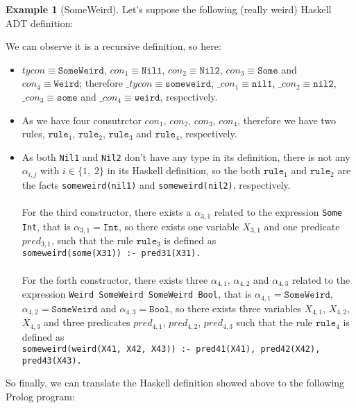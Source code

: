 \documentclass{report}
\theoremstyle{definition}
\newtheorem{example}{Example}[section]
\theoremstyle{definition}
\newcommand{\ttt}[1]{\texttt{#1}}
\begin{document}
\begin{example}[SomeWeird]
	Let's suppose the following (really weird) Haskell ADT definition:
	
	We can observe it is a recursive definition, so here:
	\begin{itemize}
		\item $tycon \equiv \ttt{SomeWeird}$, $con_1 \equiv \ttt{Nil1}$, $con_2 \equiv \ttt{Nil2}$, $con_3 \equiv \ttt{Some}$ and $con_4 \equiv \ttt{Weird}$; therefore $\_tycon \equiv \ttt{someweird}$, $\_con_1 \equiv \ttt{nil1}$, $\_con_2 \equiv \ttt{nil2}$, $\_con_3 \equiv \ttt{some}$ and $\_con_4 \equiv \ttt{weird}$, respectively.
		\item As we have four consutrctor $con_1$, $con_2$, $con_3$, $con_4$, therefore we have two rules, $\ttt{rule}_1$, $\ttt{rule}_2$, $\ttt{rule}_3$ and $\ttt{rule}_4$, respectively.
		\item As both \ttt{Nil1} and \ttt{Nil2} don't have any type in its definition, there is not any $\alpha_{i,j}$ with $i \in \{ 1,\; 2 \}$ in its Haskell definition, so the both $\ttt{rule}_1$ and $\ttt{rule}_2$ are the facts \ttt{someweird(nil1)} and \ttt{someweird(nil2)}, respectively.\\\\
		For the third constructor, there exists a $\alpha_{3,1}$ related to the expression \ttt{Some Int}, that is $\alpha_{3,1} = \ttt{Int}$, so there exists one variable $X_{3,1}$ and one predicate $pred_{3,1}$, such that the rule $\ttt{rule}_3$ is defined as \\ \ttt{someweird(some(X31)) :- pred31(X31).}\\\\
		For the forth constructor, there exists three $\alpha_{4,1}$, $\alpha_{4,2}$ and $\alpha_{4,3}$ related to the expression \ttt{Weird SomeWeird SomeWeird Bool}, that is $\alpha_{4,1} = \ttt{SomeWeird}$, $\alpha_{4,2} = \ttt{SomeWeird}$ and $\alpha_{4,3} = \ttt{Bool}$, so there exists three variables $X_{4,1}$, $X_{4,2}$, $X_{4,3}$ and three predicates $pred_{4,1}$, $pred_{4,2}$, $pred_{4,3}$ such that the rule $\ttt{rule}_4$ is defined as \\ \ttt{someweird(weird(X41, X42, X43)) :- pred41(X41), pred42(X42), pred43(X43).}
	\end{itemize}
	So finally, we can translate the Haskell definition showed above to the following Prolog program:\\
\begin{lstlisting}[language=Prolog]

\end{lstlisting}
\end{example}
\end{document}
